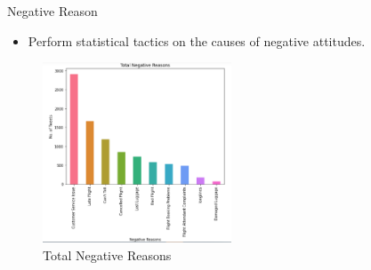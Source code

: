 \documentclass[
 size=14pt,
 paper=smartboard,  %
 mode=present, 		%
 display=slides, 	%
 style=tuliplab,  	%
 pauseslide,
 fleqn,leqno]{powerdot}
\begin{document}
\begin{slide}{Negative Reason}
  \begin{itemize}
    \item Perform statistical tactics on the causes of negative attitudes.
  \end{itemize}
  \begin{figure}[htbp]
    \centering
    \includegraphics[width=0.5\textwidth]{figures//negativereason.eps}
    \caption{Total Negative Reasons}
  \end{figure}
\end{slide}




\end{document}
